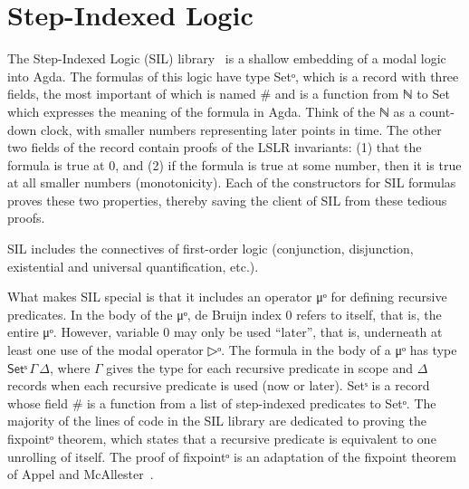 \section{Step-Indexed Logic}
\label{sec:SIL}

The Step-Indexed Logic (SIL) library~\cite{Siek:2023aa} is a shallow
embedding of a modal logic into Agda. The formulas of this logic have
type \textsf{Setᵒ}, which is a record with three fields, the most
important of which is named \textsf{\#} and is a function from ℕ to
\textsf{Set} which expresses the meaning of the formula in Agda.
Think of the ℕ as a count-down clock, with smaller numbers
representing later points in time. The other two fields of the record
contain proofs of the LSLR invariants: (1) that the formula is true at
0, and (2) if the formula is true at some number, then it is true at
all smaller numbers (monotonicity). Each of the constructors for SIL
formulas proves these two properties, thereby saving the client of SIL
from these tedious proofs.

SIL includes the connectives of first-order logic (conjunction,
disjunction, existential and universal quantification, etc.).

What makes SIL special is that it includes an operator μᵒ for defining
recursive predicates. In the body of the μᵒ, de Bruijn index 0 refers
to itself, that is, the entire μᵒ. However, variable 0 may only be
used ``later'', that is, underneath at least one use of the modal
operator ▷ᵒ.  The formula in the body of a μᵒ has type
$\mathsf{Set}ˢ\,Γ\,Δ$, where $Γ$ gives the type for each recursive
predicate in scope and $Δ$ records when each recursive predicate is
used (now or later). \textsf{Setˢ} is a record whose field \textsf{\#}
is a function from a list of step-indexed predicates to \textsf{Setᵒ}.
The majority of the lines of code in the SIL library are dedicated to
proving the \textsf{fixpointᵒ} theorem, which states that a recursive
predicate is equivalent to one unrolling of itself. The proof of
\textsf{fixpointᵒ} is an adaptation of the fixpoint theorem of Appel
and McAllester~\cite{Appel:2001aa}.

